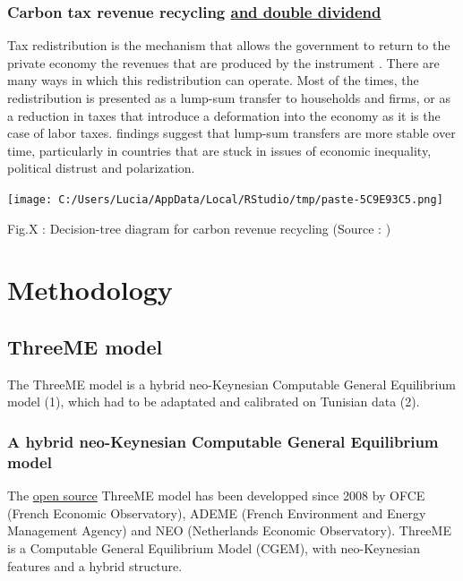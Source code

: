 \documentclass[
]{article}
\begin{document}
\hypertarget{carbon-tax-revenue-recycling-and-double-dividend}{%
\subsubsection{\texorpdfstring{Carbon tax revenue recycling
\underline{and double
dividend}}{Carbon tax revenue recycling and double dividend}}\label{carbon-tax-revenue-recycling-and-double-dividend}}

Tax redistribution is the mechanism that allows the government to return
to the private economy the revenues that are produced by the instrument
\autocite{goulder}. There are many ways in which this redistribution can
operate. Most of the times, the redistribution is presented as a
lump-sum transfer to households and firms, or as a reduction in taxes
that introduce a deformation into the economy as it is the case of labor
taxes. \textcite{klenert2018} findings suggest that lump-sum transfers
are more stable over time, particularly in countries that are stuck in
issues of economic inequality, political distrust and polarization.

\texttt{[image: C:/Users/Lucia/AppData/Local/RStudio/tmp/paste-5C9E93C5.png]}

Fig.X : Decision-tree diagram for carbon revenue recycling (Source :
\textcite{klenert2018} )

\hypertarget{methodology}{%
\section{Methodology}\label{methodology}}

\hypertarget{threeme-model}{%
\subsection{ThreeME model}\label{threeme-model}}

The ThreeME model is a hybrid neo-Keynesian Computable General
Equilibrium model (1), which had to be adaptated and calibrated on
Tunisian data (2).

\hypertarget{a-hybrid-neo-keynesian-computable-general-equilibrium-model}{%
\subsubsection{A hybrid neo-Keynesian Computable General Equilibrium
model}\label{a-hybrid-neo-keynesian-computable-general-equilibrium-model}}

The \href{https://github.com/fosem/ThreeME_V3-open}{open source} ThreeME
model has been developped since 2008 by OFCE (French Economic
Observatory), ADEME (French Environment and Energy Management Agency)
and NEO (Netherlands Economic Observatory). ThreeME is a Computable
General Equilibrium Model (CGEM), with neo-Keynesian features and a
hybrid structure.
\end{document}
